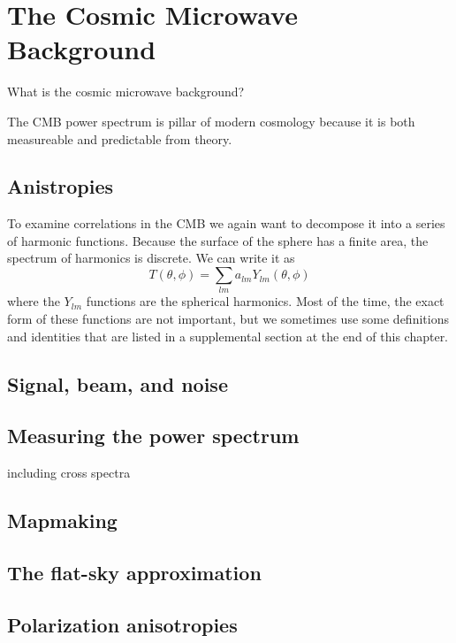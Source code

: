\chapter{The Cosmic Microwave Background}

What is the cosmic microwave background?

The CMB power spectrum is pillar of modern cosmology because it is both measureable and predictable from theory.

\section{Anistropies}
To examine correlations in the CMB we again want to decompose it into a series of harmonic functions.  Because the surface of the sphere has a finite area, the spectrum of harmonics is discrete.  We can write it as
\begin{equation}
  T(\theta,\phi) = \sum_{lm} a_{lm} Y_{lm}(\theta,\phi)
\end{equation}
where the $Y_{lm}$ functions are the spherical harmonics.  Most of the time, the exact form of these functions are not important, but we sometimes use some definitions and identities that are listed in a supplemental section at the end of this chapter.





\section{Signal, beam, and noise}


\section{Measuring the power spectrum}

including cross spectra


\section{Mapmaking}


\section{The flat-sky approximation}


\section{Polarization anisotropies}



